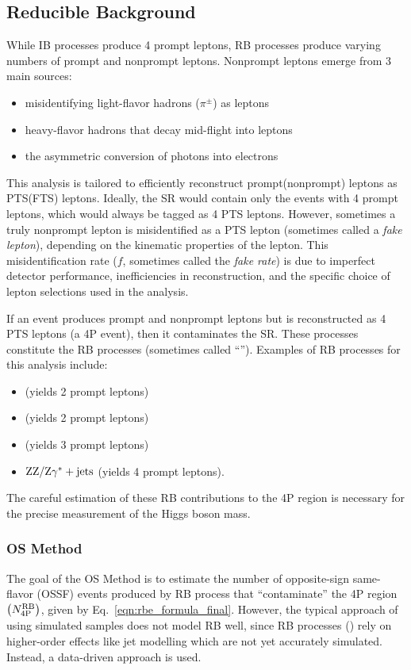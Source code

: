 \subsection{Reducible Background}
\label{sec:redbkg}
While IB processes produce 4 prompt leptons, RB processes produce varying numbers of prompt and nonprompt leptons.
Nonprompt leptons emerge from 3 main sources:
\begin{itemize}
    \item misidentifying light-flavor hadrons (\eg $\pi^{\pm}$) as leptons
    \item heavy-flavor hadrons that decay mid-flight into leptons
    \item the asymmetric conversion of photons into electrons
\end{itemize}

This analysis is tailored to efficiently reconstruct prompt(nonprompt) leptons as PTS(FTS) leptons.
Ideally, the SR would contain only the events with 4 prompt leptons, which would always be tagged as 4 PTS leptons.
However, sometimes a truly nonprompt lepton is misidentified as a PTS lepton (sometimes called a \emph{fake lepton}), depending on the kinematic properties of the lepton.
This misidentification rate ($f$, sometimes called the \emph{fake rate}) is due to imperfect detector performance, inefficiencies in reconstruction, and the specific choice of lepton selections used in the analysis.

If an event produces prompt and nonprompt leptons but is reconstructed as 4 PTS leptons (a 4P event), then it contaminates the SR.
These processes constitute the RB processes (sometimes called ``\ZplusX'').
Examples of RB processes for this analysis include:
\begin{itemize}
	\item \Zplusjets (yields 2 prompt leptons)
	\item \ttbarplusjets (yields 2 prompt leptons)
	\item \WZplusjets (yields 3 prompt leptons)
	\item $\text{Z}\text{Z}/\text{Z}\gamma^\ast + \text{jets}$ (yields 4 prompt leptons).
\end{itemize}
The careful estimation of these RB contributions to the 4P region is necessary for the precise measurement of the Higgs boson mass.

\subsubsection{OS Method}
\label{sec:os_method}
The goal of the OS Method is to estimate the number of opposite-sign same-flavor (OSSF) \fourl events produced by RB process that ``contaminate'' the 4P region $\left( N_\text{4P}^\text{RB} \right)$, given by Eq.~\ref{eqn:rbe_formula_final}.
However, the typical approach of using simulated samples does not model RB well, since RB processes (\eg \Zplusjets) rely on higher-order effects like jet modelling which are not yet accurately simulated.
Instead, a data-driven approach is used.

